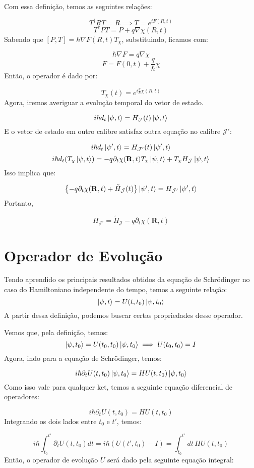 \documentclass{article}
\begin{document}
	Com essa definição, temos as seguintes relações:
	
	$$T^{\dagger}RT=R  \implies T=e^{iF(R,t)}$$
	$$T^{\dagger}PT=P+q\nabla \chi(R,t)$$
	Sabendo que $\left[ P, T\right]= \hbar{ \nabla F(R,t)}T_{\chi}$, substituindo, ficamos com:
	
	$$\hbar \nabla F=q \nabla \chi$$
	$$F=F(0,t)+\frac{q}{\hbar}\chi$$
	Então, o operador é dado por:
	
	$$T_{\chi}(t)=e^{i\frac{q}{\hbar}\chi(R,t)}$$
	Agora, iremos averiguar a evolução temporal do vetor de estado.
	
	$$i\hbar d_{t}\ket{\psi,t}=H_{\mathcal{J}}(t)\ket{\psi,t}  $$
	E o vetor de estado em outro calibre satisfaz outra equação no calibre $\mathcal{J'}$:
	
	$$i\hbar d_{t}\ket{\psi',t}=H_{\mathcal{J'}}(t)\ket{\psi',t}  $$
	$$i\hbar d_{t}(T_{\chi}\ket{\psi,t})=-q\partial_{t}\chi(\mathbf{R},t)T_{\chi}\ket{\psi,t}+T_{\chi}H_{\mathcal{J}}\ket{\psi,t}$$
	Isso implica que:
	
	$$\left\{ -q \partial_{t}\chi(\mathbf{R},t)+\tilde{H}_{\mathcal{J}}(t)  \right\}\ket{\psi',t} =H_{\mathcal{J'}}\ket{\psi',t}  $$
	Portanto,
	
	$$H_{\mathcal{J'}}=\tilde{H}_{\mathcal{J}}-q \partial_{t}\chi(\mathbf{R},t)$$
	
	\section{Operador de Evolução}
	
	Tendo aprendido os principais resultados obtidos da equação de Schrödinger no caso do Hamiltoniano independente do tempo, temos a seguinte relação:
	$$\ket{\psi,t} =U(t,t_{0})\ket{\psi,t_{0}} $$
	A partir dessa definição, podemos buscar certas propriedades desse operador.
	
	Vemos que, pela definição, temos:
	$$\ket{\psi,t_{0}}=U(t_{0},t_{0})\ket{\psi,t_{0}} \implies U(t_{0},t_{0})=I$$
	Agora, indo para a equação de Schrödinger, temos:
	
	$$i\hbar \partial_{t} U(t,t_{0})\ket{\psi,t_{0}} =HU(t,t_{0})\ket{\psi,t_{0}} $$
	Como isso vale para qualquer ket, temos a seguinte equação diferencial de operadores:
	
	$$i\hbar \partial_{t}U(t,t_{0})=HU(t,t_{0})$$
	Integrando os dois lados entre $t_0$ e $t'$, temos:
	
	$$i\hbar  \int_{t_{0}}^{t'}\partial_{t}U(t,t_{0})dt=i\hbar(U(t',t_{0})-I)=\int_{t_{0}}^{t'} dt\,HU(t,t_{0})$$
	Então, o operador de evolução $U$ será dado pela seguinte equação integral:
	
\end{document}
